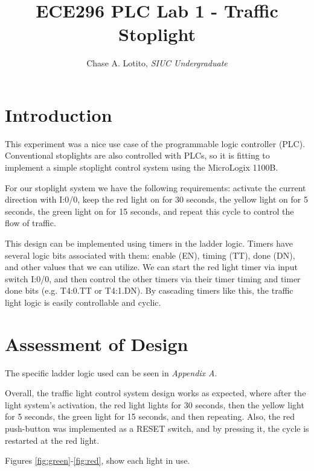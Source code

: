 \documentclass{article}
\title{ECE296 PLC Lab 1 - Traffic Stoplight}
\author{Chase A. Lotito, \textit{SIUC Undergraduate}}
\date{}
\begin{document}
\maketitle %

\section{Introduction} 

This experiment was a nice use case of the programmable logic controller (PLC). Conventional stoplights are also controlled with PLCs, so it is fitting to implement a simple stoplight control system using the MicroLogix 1100B. 

For our stoplight system we have the following requirements: activate the current direction with I:0/0, keep the red light on for 30 seconds, the yellow light on for 5 seconds, the green light on for 15 seconds, and repeat this cycle to control the flow of traffic.

This design can be implemented using timers in the ladder logic. Timers have several logic bits associated with them: enable (EN), timing (TT), done (DN), and other values that we can utilize. We can start the red light timer via input switch I:0/0, and then control the other timers via their timer timing and timer done bits (e.g. T4:0.TT or T4:1.DN). By cascading timers like this, the traffic light logic is easily controllable and cyclic.

\section{Assessment of Design}

The specific ladder logic used can be seen in \textit{Appendix A}. 

Overall, the traffic light control system design works as expected, where after the light system's activation, the red light lights for 30 seconds, then the yellow light for 5 seconds, the green light for 15 seconds, and then repeating. Also, the red push-button was implemented as a RESET switch, and by pressing it, the cycle is restarted at the red light.

Figures \ref{fig:green}-\ref{fig:red}, show each light in use.
\end{document}
